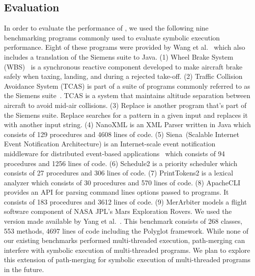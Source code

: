 \subsection{Evaluation}
%
In order to evaluate the performance of \tool, we used the following nine benchmarking programs commonly used to
evaluate symbolic execution performance.
%
Eight of these programs were provided by Wang et al.~\cite{dgse} which also includes a translation of the
Siemens suite to Java.
%
(1) Wheel Brake System (WBS)~\cite{yang2014directed} is a synchronous reactive
component developed to make aircraft brake safely when taxing, landing, and during a rejected take-off.
%
(2) Traffic Collision Avoidance System (TCAS) is part of a suite of programs commonly referred to as the Siemens
suite~\cite{siemens-benchmarks}. TCAS is a system that maintains altitude separation between aircraft to avoid mid-air
collisions.
%
(3) Replace is another program that\rq s part of the Siemens suite. Replace searches for a pattern in a given input and
replaces it with another input string.
%
(4) NanoXML is an XML Parser written in Java which consists of 129 procedures and 4608 lines of code.
%
(5) Siena~(Scalable Internet Event Notification Architecture) is an Internet-scale event notification middleware for
distributed event-based applications~\cite{siena} which consists of 94 procedures and 1256 lines of code.
%
(6) Schedule2 is a priority scheduler which consists of 27 procedures and 306 lines of code.
%
(7) PrintTokens2 is a lexical analyzer which consists of 30 procedures and 570 lines of code.
%
(8) ApacheCLI~\cite{apachecli} provides an API for parsing command lines options passed to programs.
It consists of 183 procedures and 3612 lines of code.
%
(9) MerArbiter models a flight software component of NASA JPL\rq s Mars Exploration Rovers.
%
%
We used the version made
available by Yang et al.~\cite{memoise}. This benchmark consists of 268 classes, 553 methods, 4697 lines of code
including the Polyglot framework.
%
While none of our existing benchmarks performed multi-threaded execution, path-merging can interfere with symbolic
execution of multi-threaded programs.
%
We plan to explore this extension of path-merging for symbolic execution of multi-threaded programs in the future.

